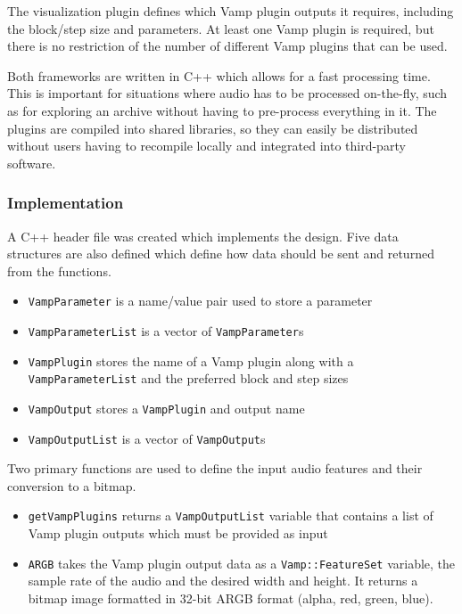 The visualization plugin defines which Vamp plugin outputs it requires,
including the block/step size and parameters. At least one Vamp plugin is
required, but there is no restriction of the number of different Vamp plugins
that can be used.

Both frameworks are written in C++ which allows for a fast processing time.
This is important for situations where audio has to be processed on-the-fly,
such as for exploring an archive without having to pre-process everything in
it.  The plugins are compiled into shared libraries, so they can easily be
distributed without users having to recompile locally and integrated into
third-party software.

\subsubsection{Implementation}
A C++ header file was created which implements the design.  Five data
structures are also defined which define how data should be sent and returned
from the functions.

{\singlespacing
\begin{itemize}
  \item \texttt{VampParameter} is a name/value pair used to store a parameter
  \item \texttt{VampParameterList} is a vector of \texttt{VampParameter}s
  \item \texttt{VampPlugin} stores the name of a Vamp plugin along with a
    \texttt{VampParameterList} and the preferred block and step sizes
  \item \texttt{VampOutput} stores a \texttt{VampPlugin} and output name
  \item \texttt{VampOutputList} is a vector of \texttt{VampOutput}s
\end{itemize}
}

Two primary functions are used to define the input audio features and their
conversion to a bitmap.

\begin{itemize}
  \item \texttt{getVampPlugins} returns a \texttt{VampOutputList} variable
    that contains a list of Vamp plugin outputs which must be provided as
    input
  \item \texttt{ARGB} takes the Vamp plugin output data as a
    \texttt{Vamp::FeatureSet} variable, the sample rate of the audio and the
    desired width and height. It returns a bitmap image formatted in 32-bit
    ARGB format (alpha, red, green, blue).
\end{itemize}

